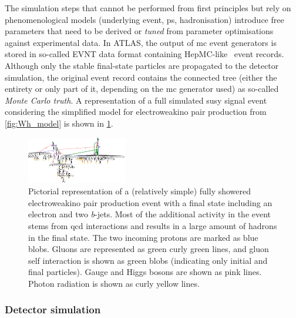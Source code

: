  The simulation steps that cannot be performed from first principles but rely on phenomenological models (underlying event, \gls{ps}, hadronisation) introduce free parameters that need to be derived or \textit{tuned} from parameter optimisations against experimental data. In ATLAS, the output of \gls{mc} event generators is stored in so-called EVNT data format containing HepMC-like~\cite{Dobbs:2001ck} event records. Although only the stable final-state particles are propagated to the detector simulation, the original event record contains the connected tree (either the entirety or only part of it, depending on the \gls{mc} generator used) as so-called \textit{Monte Carlo truth}. A representation of a full simulated \gls{susy} signal event considering the simplified model for electroweakino pair production from \cref{fig:Wh_model} is shown in \cref{fig:mcviz_signal}. 
		
\begin{figure}
	\centering    
	\includegraphics[width=\textwidth]{test26}
	\caption{Pictorial representation of a (relatively simple) fully showered electroweakino pair production event with a final state including an electron and two \textit{b}-jets. Most of the additional activity in the event stems from \gls{qcd} interactions and results in a large amount of hadrons in the final state. The two incoming protons are marked as blue blobs. Gluons are represented as green curly green lines, and gluon self interaction is shown as green blobs (indicating only initial and final particles). Gauge and Higgs bosons are shown as pink lines. Photon radiation is shown as curly yellow lines.}
	\label{fig:mcviz_signal}
\end{figure}		
		
\subsubsection{Detector simulation}\label{sec:detector_simulation}

